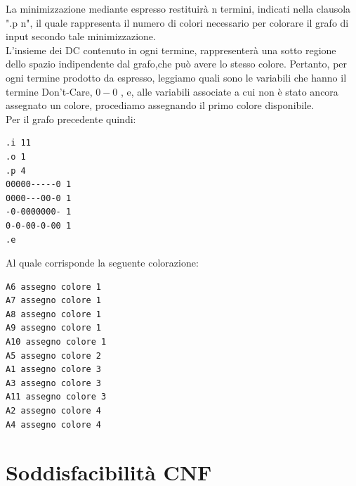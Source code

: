 \documentclass[a4paper,11pt]{article} %
\begin{document}
La minimizzazione mediante espresso restituirà n termini, indicati nella clausola ".p n", il quale rappresenta il numero di colori necessario per colorare il grafo di input secondo tale minimizzazione.\\
L’insieme dei DC contenuto in ogni termine, rappresenterà una sotto regione dello spazio indipendente dal grafo,che può avere lo stesso colore. Pertanto, per ogni termine prodotto da espresso, leggiamo quali sono le variabili che hanno il termine Don’t-Care, $0 - 0$ , e, alle variabili associate a cui non è stato ancora assegnato un colore, procediamo assegnando il primo colore disponibile.\\
Per il grafo precedente quindi:
\begin{verbatim}
.i 11
.o 1
.p 4
00000-----0 1
0000---00-0 1
-0-0000000- 1
0-0-00-0-00 1
.e
\end{verbatim}
Al quale corrisponde la seguente colorazione:
\begin{verbatim}
A6 assegno colore 1
A7 assegno colore 1
A8 assegno colore 1
A9 assegno colore 1
A10 assegno colore 1
A5 assegno colore 2
A1 assegno colore 3
A3 assegno colore 3
A11 assegno colore 3
A2 assegno colore 4
A4 assegno colore 4
\end{verbatim}


\pagebreak

\section{Soddisfacibilità CNF}
\end{document}
